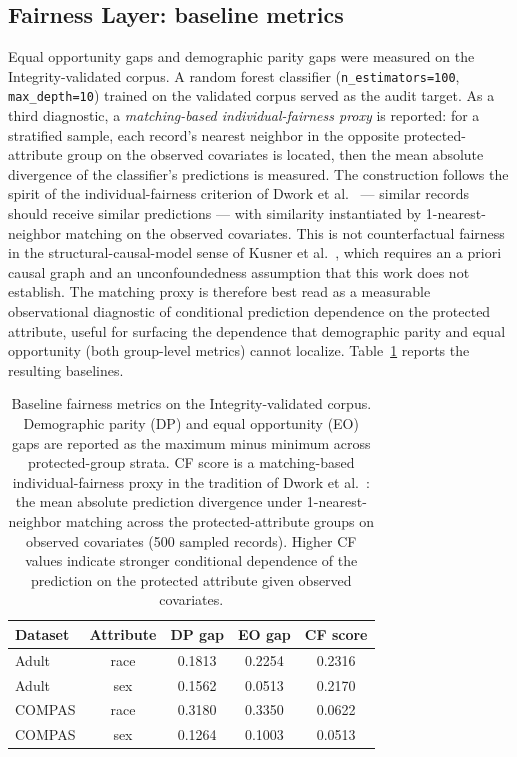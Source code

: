 \documentclass[11pt]{article}
\begin{document}
\subsection{Fairness Layer: baseline metrics}

Equal opportunity gaps \cite{hardt2016equality} and demographic parity gaps \cite{calders2010naivebayes} were measured on the Integrity-validated corpus. A random forest classifier (\texttt{n\_estimators=100}, \texttt{max\_depth=10}) trained on the validated corpus served as the audit target. As a third diagnostic, a \emph{matching-based individual-fairness proxy} is reported: for a stratified sample, each record's nearest neighbor in the opposite protected-attribute group on the observed covariates is located, then the mean absolute divergence of the classifier's predictions is measured. The construction follows the spirit of the individual-fairness criterion of Dwork et al.\ \cite{Dwork2012Fairness} --- similar records should receive similar predictions --- with similarity instantiated by 1-nearest-neighbor matching on the observed covariates. This is not counterfactual fairness in the structural-causal-model sense of Kusner et al.\ \cite{kusner2017counterfactual}, which requires an a priori causal graph and an unconfoundedness assumption that this work does not establish. The matching proxy is therefore best read as a measurable observational diagnostic of conditional prediction dependence on the protected attribute, useful for surfacing the dependence that demographic parity and equal opportunity (both group-level metrics) cannot localize. Table~\ref{tab:baseline} reports the resulting baselines.

\begin{table}[h]
\centering
\small
\caption{Baseline fairness metrics on the Integrity-validated corpus. Demographic parity (DP) and equal opportunity (EO) gaps are reported as the maximum minus minimum across protected-group strata. CF score is a matching-based individual-fairness proxy in the tradition of Dwork et al.\ \cite{Dwork2012Fairness}: the mean absolute prediction divergence under 1-nearest-neighbor matching across the protected-attribute groups on observed covariates (500 sampled records). Higher CF values indicate stronger conditional dependence of the prediction on the protected attribute given observed covariates.}
\label{tab:baseline}
\begin{tabular}{lcccc}
\toprule
\textbf{Dataset} & \textbf{Attribute} & \textbf{DP gap} & \textbf{EO gap} & \textbf{CF score} \\
\midrule
Adult  & race & 0.1813 & 0.2254 & 0.2316 \\
Adult  & sex  & 0.1562 & 0.0513 & 0.2170 \\
COMPAS & race & 0.3180 & 0.3350 & 0.0622 \\
COMPAS & sex  & 0.1264 & 0.1003 & 0.0513 \\
\bottomrule
\end{tabular}
\end{table}
\end{document}

